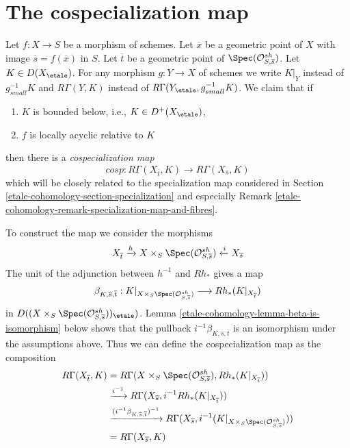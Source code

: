 \section{The cospecialization map}
\label{etale-cohomology-section-cospecialization}
Let $f : X \to S$ be a morphism of schemes. Let $\overline{x}$ be a
geometric point of $X$ with image $\overline{s} = f(\overline{x})$ in $S$.
Let $\overline{t}$ be a geometric point of
$\Spec(\mathcal{O}^{sh}_{S, \overline{s}})$.
Let $K \in D(X_\etale)$. For any morphism $g : Y \to X$ of schemes
we write $K|_Y$ instead of $g_{small}^{-1}K$ and $R\Gamma(Y, K)$
instead of $R\Gamma(Y_\etale, g_{small}^{-1}K)$.
We claim that if
\begin{enumerate}
\item $K$ is bounded below, i.e., $K \in D^+(X_\etale)$,
\item $f$ is locally acyclic relative to $K$
\end{enumerate}
then there is a {\it cospecialization map}
$$
cosp :
R\Gamma(X_{\overline{t}}, K)
\longrightarrow
R\Gamma(X_{\overline{s}}, K)
$$
which will be closely related to the specialization map
considered in Section \ref{etale-cohomology-section-specialization} and especially
Remark \ref{etale-cohomology-remark-specialization-map-and-fibres}.

\medskip\noindent
To construct the map we consider the morphisms
$$
X_{\overline{t}}
\xrightarrow{h}
X \times_S \Spec(\mathcal{O}^{sh}_{S, \overline{s}})
\xleftarrow{i}
X_{\overline{s}}
$$
The unit of the adjunction between $h^{-1}$ and $Rh_*$ gives a map
$$
\beta_{K, \overline{s}, \overline{t}} :
K|_{X \times_S \Spec(\mathcal{O}^{sh}_{S, \overline{s}})}
\longrightarrow
Rh_*(K|_{X_{\overline{t}}})
$$
in $D((X \times_S \Spec(\mathcal{O}^{sh}_{S, \overline{s}}))_\etale)$.
Lemma \ref{etale-cohomology-lemma-beta-is-isomorphism} below shows that the pullback
$i^{-1}\beta_{K, \overline{s}, \overline{t}}$
is an isomorphism under the assumptions above.
Thus we can define the cospecialization map as the composition
\begin{align*}
R\Gamma(X_{\overline{t}}, K)
& =
R\Gamma(X \times_S \Spec(\mathcal{O}^{sh}_{S, \overline{s}}),
Rh_*(K|_{X_{\overline{t}}})) \\
&
\xrightarrow{i^{-1}}
R\Gamma(X_{\overline{s}}, i^{-1}Rh_*(K|_{X_{\overline{t}}})) \\
&
\xrightarrow{(i^{-1}\beta_{K, \overline{s}, \overline{t}})^{-1}}
R\Gamma(X_{\overline{s}},
i^{-1}(K|_{X \times_S \Spec(\mathcal{O}^{sh}_{S, \overline{s}})})) \\
& =
R\Gamma(X_{\overline{s}}, K)
\end{align*}

